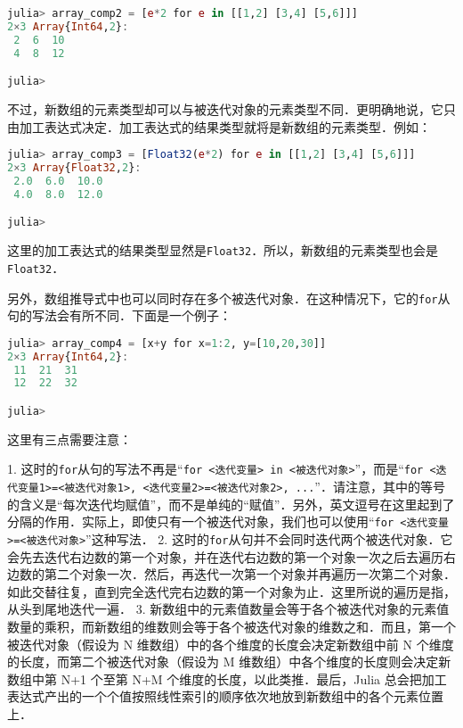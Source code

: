 \begin{lstlisting}[language=julia]
julia> array_comp2 = [e*2 for e in [[1,2] [3,4] [5,6]]]
2×3 Array{Int64,2}:
 2  6  10
 4  8  12

julia> 
\end{lstlisting}

不过，新数组的元素类型却可以与被迭代对象的元素类型不同．更明确地说，它只由加工表达式决定．加工表达式的结果类型就将是新数组的元素类型．例如：

\begin{lstlisting}[language=julia]
julia> array_comp3 = [Float32(e*2) for e in [[1,2] [3,4] [5,6]]]
2×3 Array{Float32,2}:
 2.0  6.0  10.0
 4.0  8.0  12.0

julia> 
\end{lstlisting}

这里的加工表达式的结果类型显然是\verb|Float32|．所以，新数组的元素类型也会是\verb|Float32|．

另外，数组推导式中也可以同时存在多个被迭代对象．在这种情况下，它的\verb|for|从句的写法会有所不同．下面是一个例子：

\begin{lstlisting}[language=julia]
julia> array_comp4 = [x+y for x=1:2, y=[10,20,30]]
2×3 Array{Int64,2}:
 11  21  31
 12  22  32

julia> 
\end{lstlisting}

这里有三点需要注意：

1. 这时的\verb|for|从句的写法不再是“\verb|for <迭代变量> in <被迭代对象>|”，而是“\verb|for <迭代变量1>=<被迭代对象1>, <迭代变量2>=<被迭代对象2>, ...|”．请注意，其中的等号的含义是“每次迭代均赋值”，而不是单纯的“赋值”．另外，英文逗号在这里起到了分隔的作用．实际上，即使只有一个被迭代对象，我们也可以使用“\verb|for <迭代变量>=<被迭代对象>|”这种写法．
2. 这时的\verb|for|从句并不会同时迭代两个被迭代对象．它会先去迭代右边数的第一个对象，并在迭代右边数的第一个对象一次之后去遍历右边数的第二个对象一次．然后，再迭代一次第一个对象并再遍历一次第二个对象．如此交替往复，直到完全迭代完右边数的第一个对象为止．这里所说的遍历是指，从头到尾地迭代一遍．
3. 新数组中的元素值数量会等于各个被迭代对象的元素值数量的乘积，而新数组的维数则会等于各个被迭代对象的维数之和．而且，第一个被迭代对象（假设为 N 维数组）中的各个维度的长度会决定新数组中前 N 个维度的长度，而第二个被迭代对象（假设为 M 维数组）中各个维度的长度则会决定新数组中第 N+1 个至第 N+M 个维度的长度，以此类推．最后，Julia 总会把加工表达式产出的一个个值按照线性索引的顺序依次地放到新数组中的各个元素位置上．


